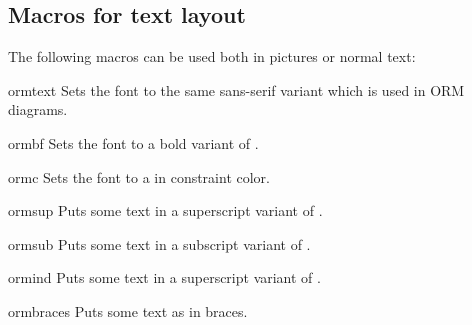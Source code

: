 \documentclass[a4paper,10pt]{article}
\begin{document}
\begin{codeexample}[]
\end{codeexample}


\subsection{Macros for text layout} 
\label{sec:ormtext}
The following macros can be used both in \tikzname{} pictures or normal text:

\begin{command}{ormtext}
Sets the font to the same sans-serif variant which is used in ORM diagrams.
\end{command}

\begin{command}{ormbf}
Sets the font to a bold variant of .
\end{command}

\begin{command}{ormc}
Sets the font to a  in constraint color.
\end{command}

\begin{command}{ormsup}
Puts some text in a superscript variant of .
\end{command}

\begin{command}{ormsub}
Puts some text in a subscript variant of .
\end{command}

\begin{command}{ormind}
Puts some text in a superscript variant of .
\end{command}

\begin{command}{ormbraces}
Puts some text as  in braces.
\end{command}
\end{document}
